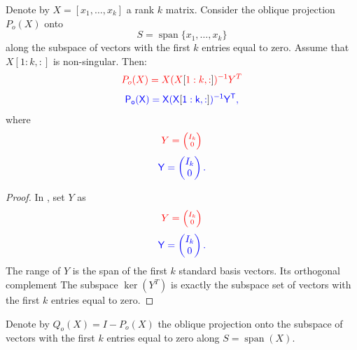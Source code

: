 \documentclass[10pt,twoside]{siamart1116}
\DeclareMathOperator{\spn}{span}
\numberwithin{theorem}{section}
\providecommand{\DIFadd}[1]{{\protect\color{blue} \sf #1}} %
\providecommand{\DIFdel}[1]{{\protect\color{red} \scriptsize #1}} %
\providecommand{\DIFaddbegin}{} %
\providecommand{\DIFaddend}{} %
\providecommand{\DIFdelbegin}{} %
\providecommand{\DIFdelend}{} %
\begin{document}
\begin{lemma}\label{lem:oblique_projection_specific}
  Denote by $X = [x_1, \ldots, x_k]$ a rank $k$ matrix. Consider the oblique projection $P_o(X)$ onto
  \[ S = \spn\{ x_1,\dots,x_k \} \] %
  along the subspace of vectors with the first $k$ entries equal to zero. Assume that $X[1:k,:]$ is non-singular. Then:
  \DIFdelbegin \[ \DIFdel{P_o(X) = X }{\DIFdel{(X}[\DIFdel{1:k,:}]\DIFdel{)}}\DIFdel{^{-1} Y^T }\]%
\DIFdelend \DIFaddbegin \[ \DIFadd{P_o(X) = X }{\DIFadd{(X}[\DIFadd{1:k,:}]\DIFadd{)}}\DIFadd{^{-1} Y^T, }\]\DIFaddend 
  where
  \DIFdelbegin \[ \DIFdel{Y = \begin{pmatrix}
			I_k \\ 0
		\end{pmatrix} }\]%
\DIFdelend \DIFaddbegin \[ \DIFadd{Y =
    \begin{pmatrix}
      I_k \\ 0
  \end{pmatrix}. }\]\DIFaddend 
\end{lemma}

\begin{proof}
  In , set $Y$ as
  \DIFdelbegin \[ \DIFdel{Y = \begin{pmatrix}
			I_k \\ 0
		\end{pmatrix} }\]%
\DIFdelend \DIFaddbegin \[ \DIFadd{Y =
    \begin{pmatrix}
      I_k \\ 0
  \end{pmatrix}. }\]\DIFaddend 
  The range of $Y$ is the span of the first $k$ standard basis vectors. \DIFdelbegin \DIFdel{Its orthogonal complement }\DIFdelend \DIFaddbegin \DIFadd{The subspace $\ker(Y^T)$ }\DIFaddend is exactly the \DIFdelbegin \DIFdel{subspace }\DIFdelend \DIFaddbegin \DIFadd{set }\DIFaddend of vectors with the first $k$ entries equal to zero.
\end{proof}

Denote by $Q_o(X) = I - P_o(X)$ the oblique projection onto the subspace of vectors with the first $k$ entries equal to zero along $S=\spn(X)$.
\end{document}
